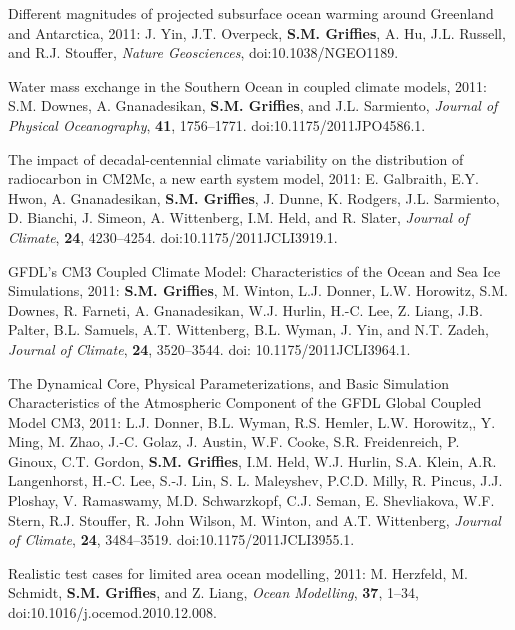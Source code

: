 \begin{etaremune}
\item Different magnitudes of projected subsurface ocean warming
  around Greenland and Antarctica, 2011: J. Yin, J.T. Overpeck, {\bf
    S.M. Griffies}, A. Hu, J.L. Russell, and R.J. Stouffer, {\it
    Nature Geosciences}, doi:10.1038/NGEO1189.

\item Water mass exchange in the Southern Ocean in coupled climate
  models, 2011: S.M. Downes, A. Gnanadesikan, {\bf S.M. Grif\/f\/ies},
  and J.L. Sarmiento, {\it Journal of Physical Oceanography}, {\bf
    41}, 1756--1771.  doi:10.1175/2011JPO4586.1.

\item The impact of decadal-centennial climate variability on the
  distribution of radiocarbon in CM2Mc, a new earth system model,
  2011: E. Galbraith, E.Y. Hwon, A. Gnanadesikan, {\bf
    S.M. Grif\/f\/ies}, J. Dunne, K. Rodgers, J.L. Sarmiento, D.
  Bianchi, J. Simeon, A. Wittenberg, I.M. Held, and R.  Slater, {\it
    Journal of Climate}, {\bf 24}, 4230--4254.
  doi:10.1175/2011JCLI3919.1.

\item GFDL's CM3 Coupled Climate Model: Characteristics of the Ocean
  and Sea Ice Simulations, 2011: {\bf S.M. Grif\/f\/ies}, M. Winton,
  L.J. Donner, L.W. Horowitz, S.M. Downes, R.  Farneti,
  A. Gnanadesikan, W.J. Hurlin, H.-C. Lee, Z. Liang, J.B. Palter,
  B.L. Samuels, A.T. Wittenberg, B.L. Wyman, J.  Yin, and N.T. Zadeh,
  {\it Journal of Climate}, {\bf 24}, 3520--3544.  doi:
  10.1175/2011JCLI3964.1.

\item The Dynamical Core, Physical Parameterizations, and Basic Simulation Characteristics of the Atmospheric Component of the GFDL Global Coupled Model CM3, 2011: L.J. Donner, B.L. Wyman, R.S. Hemler, L.W. Horowitz,, Y. Ming, M. Zhao, J.-C. Golaz, J. Austin, W.F. Cooke, S.R. Freidenreich, P. Ginoux, C.T. Gordon, {\bf S.M. Grif\/f\/ies}, I.M. Held, W.J. Hurlin, S.A. Klein, A.R. Langenhorst, H.-C. Lee, S.-J. Lin, S. L. Maleyshev, P.C.D. Milly, R. Pincus, J.J. Ploshay, V. Ramaswamy, M.D. Schwarzkopf, C.J. Seman, E. Shevliakova, W.F. Stern, R.J. Stouﬀer, R. John Wilson, M.  Winton, and A.T. Wittenberg, {\it Journal of Climate}, {\bf 24}, 3484--3519. 
  doi:10.1175/2011JCLI3955.1.

\item Realistic test cases for limited area ocean modelling, 2011: M. Herzfeld, M. Schmidt, {\bf S.M. Grif\/f\/ies}, and Z. Liang, {\it    Ocean Modelling}, {\bf 37}, 1--34, doi:10.1016/j.ocemod.2010.12.008.


\end{etaremune}
